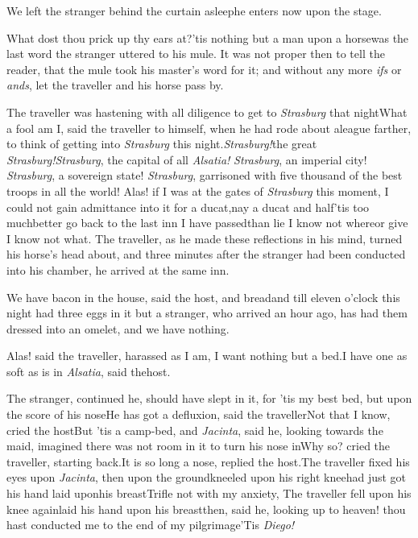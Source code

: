 \documentclass{article}
\begin{document}
We left the stranger behind the curtain asleep\tsk he
enters now upon the stage.

\tsk What dost thou prick up thy ears at?\tsk ’tis nothing
but a man upon a horse\tsk was the last word the stranger
uttered to his mule. It was not proper then to tell the
reader, that the mule took his master’s word for it; and
without any more \textit{ifs} or \textit{ands}, let the
traveller and his horse pass by.

The traveller was hastening with all diligence to get to
\textit{Strasburg} that night\break\tsk What a fool am I, said the
traveller to himself, when he had rode about a\pb league farther,
to think of getting into \textit{Strasburg} this
night.\tsk \textit{Strasburg!}\tsk the great
\textit{Strasburg!}\tsk \textit{Strasburg}, the capital of all
\textit{Alsatia!} \textit{Strasburg}, an imperial city!
\textit{Strasburg}, a sovereign state! \textit{Strasburg}, garrisoned
with five thousand of the best troops in all the world!\tsk
Alas!\break
if I was at the gates of \textit{Strasburg} this moment, I could not
gain admittance into it for a ducat,\tsk nay a ducat and
half\tsk ’tis too much\tsk better go back to the last inn
I have passed\tsk than lie I know not
where\tsk or give I know not what. The traveller, as he
made these reflections in his mind, turned his horse’s head
about, and three minutes after the stranger had been conducted into
his chamber, he arrived at the same inn.

\tsk We have bacon in the house, said the host, and
bread\tsh and till eleven o’clock this night had
three eggs in it\tsk\pb
but a stranger, who arrived an hour
ago, has had them dressed into an omelet, and we have
nothing.\tsh

\tsk Alas! said the traveller, harassed as I am, I want nothing but a
bed.\tsh I have one as soft as is in \textit{Alsatia}, said
the\break host.

\tsk The stranger, continued he, should have slept in
it, for ’tis my best bed, but upon the score of his
nose\tsk He has got a defluxion, said the
traveller\tsk Not that I know, cried the
host\tsk But ’tis a camp-bed, and \textit{Jacinta},
said he, looking towards the maid, imagined there was not room in
it to turn his nose in\tsk Why so? cried the traveller,
starting back.\tsk It is so long a nose, replied the
host.\tsk The traveller fixed his eyes upon
\textit{Jacinta}, then upon the ground\tsk kneeled upon his
right\pb
knee\tsk had just got his hand laid upon\break his
breast\tsk Trifle not with my anxiety,
\break
\tsk The traveller fell
upon his knee again\tsk laid his hand upon his breast\tsk then,
said he, looking up to heaven! thou hast conducted me to the end of
my pilgrimage\break\tsh ’Tis \textit{Diego!}
\end{document}
